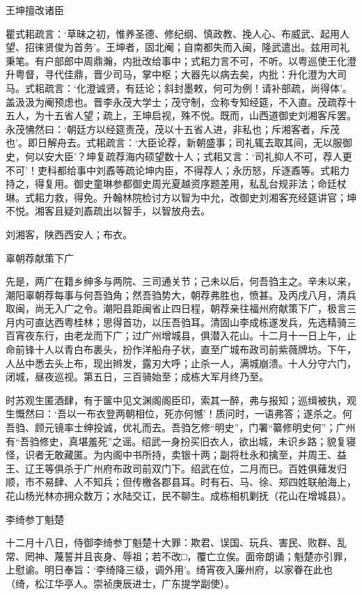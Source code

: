 \documentclass[]{article}
\begin{document}
王坤擅改诸臣

瞿式耜疏言：`草昧之初，惟养圣德、修纪纲、慎政教、挽人心、布威武、起用人望、招徕贤俊为首务'。王坤者，固北阉；自南都失而入闽，隆武遣出。兹用司礼秉笔。有户部郎中周鼎瀚，内批改给事中；式耜力言不可，不听。以粤巡使王化澄升粤督，寻代佳鼎，晋少司马，掌中枢；大器先以病去矣，内批：升化澄为大司马。式耜疏言：`化澄诚贤，有廷论；斜封墨敕，何可为例！请补部疏，尚得体'。盖汲汲为阉预虑也。晋李永茂大学士；茂守制，佥称专知经筵，不入直。茂疏荐十五人，为十五省人望；疏上，王坤启视，殊不悦。既而，山西道御史刘湘客斥罢。永茂怫然曰：`朝廷方以经筵责茂，茂以十五省人进，非私也；斥湘客者，斥茂也'。即日解舟去。式耜疏言：`大臣论荐，新朝盛事；司礼辄去取其间，无以服御史，何以安大臣'？坤复疏荐海内硕望数十人；式耜又言：`司礼抑人不可，荐人更不可'！吏科都给事中刘鼒等疏论坤内臣，不得荐人；永历怒，斥逐鼒等。式耜力持之，得复用。御史童琳参都御史周光夏越资序题差用，私乱台规非法；命廷杖琳。式耜力救，得免。升翰林院检讨方以智为中允，改御史刘湘客充经筵讲官；坤不悦。湘客且疑刘鼒疏出以智手，以智放舟去。

刘湘客，陕西西安人；布衣。

辜朝荐献策下广

先是，两广在籍乡绅多与两院、三司通关节；己未以后，何吾驺主之。辛未以来，潮阳辜朝荐每事与何吾驺角；然吾驺势大，朝荐弗胜也，愤甚。及丙戌八月，清兵取闽，尚无入广之令。潮阳县距闽省止四日程，朝荐亲往福州府献策下广，极言三月内可直达西粤桂林；思得首功，以压吾驺耳。清固山李成栋遂发兵，先选精骑三百宵夜东行，由老龙而下广；过广州增城县，俱潜入花山。十二月十一日上午，止命前锋十人以青白布裹头，扮作洋船舟子状，直至广城布政司前紫薇牌坊。下午，人丛中悉去头上布，现出辫发，露刃大呼；止杀一人，满城崩溃。十人分守六门，闭城，昼夜巡视。第五日，三百骑始至；成栋大军月终乃至。

时苏观生匿酒肆，有于箧中见文渊阁阁臣印，索其一醉，弗与报知；巡缉被执，观生慨然曰：`吾以一布衣登两朝相位，死亦何憾'！质问时，一语弗答；遂杀之。何吾驺、顾元镜率士绅投诚，优礼而去。吾驺乞修``明史''，门署``纂修明史何''；广州有``吾驺修史，真堪羞死''之谣。绍武一身扮买旧衣人，欲出城，未识乡路；貌复寝怪，识者无敢藏匿。为内阁中书所持，卖银十两；副将杜永和擒至，并周王、益王、辽王等俱杀于广州府布政司前双门下。绍武在位，二月而已。百姓俱薙发归顺，市不易肆、人不知兵；但传檄各郡县耳。时有石、马、徐、郑四姓联舶海上，花山杨光林亦拥众数万；水陆交讧，民不聊生。成栋相机剿抚（花山在增城县）。

李绮参丁魁楚

十二月十八日，侍御李绮参丁魁楚十大罪：欺君、误国、玩兵、害民、败群、乱常、罔神、蔑誓并且丧身、辱祖；若不改□，覆亡立俟。面帝朗诵；魁楚亦引罪，上慰谕。明日奉旨：`李绮降三级，调外用'。绮宵夜入廉州府，以家眷在此也（绮，松江华亭人。崇祯庚辰进士，广东提学副使）。
\end{document}
